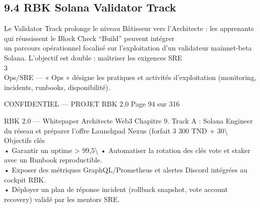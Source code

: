 \subsection{9.4 RBK Solana Validator Track}
Le Validator Track prolonge le niveau Bâtisseur vers l’Architecte : les apprenants qui réussissent le Block Check “Build” peuvent intégrer\\
un parcours opérationnel focalisé sur l’exploitation d’un validateur mainnet-beta Solana. L’objectif est double : maîtriser les exigences SRE\\
3\\
Ops/SRE — « Ops » désigne les pratiques et activités d’exploitation (monitoring, incidents, runbooks, disponibilité).\\
\vspace{0.5em}
\vspace{0.5em}
\vspace{0.5em}
\begin{confidential}CONFIDENTIEL — PROJET RBK 2.0                                               Page 94 sur 316\end{confidential}
RBK 2.0 — Whitepaper Architecte Web3                                                                   Chapitre 9. Track A : Solana Engineer\\
\vspace{0.5em}
\vspace{0.5em}
du réseau et préparer l’offre Launchpad Nexus (forfait 3 300 TND + 30\textbackslash{}%
\vspace{0.5em}
Objectifs clés\\
\vspace{0.5em}
• Garantir un uptime \textgreater{} 99,5\textbackslash{}%
\vspace{0.5em}
• Automatiser la rotation des clés vote et staker avec un Runbook reproductible.\\
\vspace{0.5em}
• Exposer des métriques GraphQL/Prometheus et alertes Discord intégrées au cockpit RBK.\\
\vspace{0.5em}
• Déployer un plan de réponse incident (rollback snapshot, vote account recovery) validé par les mentors SRE.\\
\vspace{0.5em}
\vspace{0.5em}
